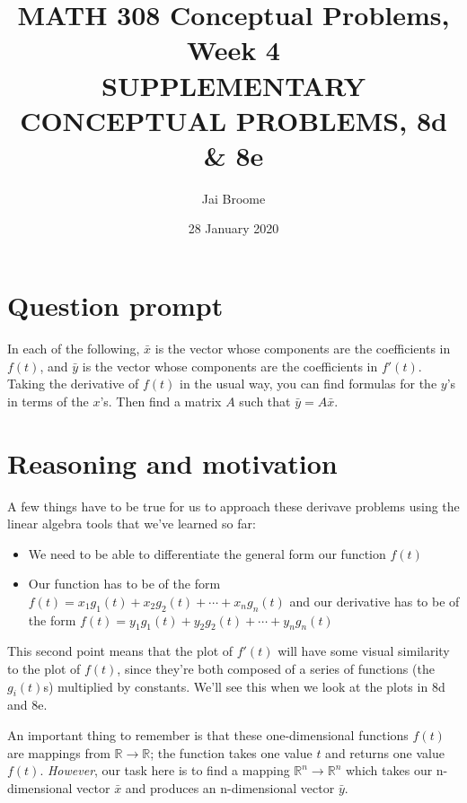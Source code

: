\documentclass[12pt]{article}
\title{MATH 308 Conceptual Problems, Week 4 \vspace{1em}\\\normalsize{SUPPLEMENTARY CONCEPTUAL PROBLEMS, 8d \& 8e}}
\author{Jai Broome}
\date{28 January 2020}
\begin{document}

\maketitle

\section{Question prompt}

In each of the following, $\bar{x}$ is the vector whose components are the coefficients
in $f(t)$, and $\bar{y}$ is the vector whose components are the coefficients in $f'(t)$. Taking
the derivative of $f(t)$ in the usual way, you can find formulas for the $y$'s in terms
of the $x$'s. Then find a matrix $A$ such that $\bar{y}=A\bar{x}$.

\section{Reasoning and motivation}

A few things have to be true for us to approach these derivave problems using the linear algebra
tools that we've learned so far:

\begin{itemize}
  \item We need to be able to differentiate the general form our function $f(t)$ 
  \item Our function has to be of the form $f(t)=x_1g_1(t)+x_2g_2(t)+\cdots +x_{n}g_n(t)$ and
    our derivative has to be of the form $f(t)=y_1g_1(t)+y_2g_2(t)+\cdots +y_{n}g_n(t)$
\end{itemize}

This second point means that the plot of $f'(t)$ will have some visual similarity to the plot of
$f(t)$, since they're both composed of a series of functions (the $g_i(t)$s) multiplied by constants.
We'll see this when we look at the plots in 8d and 8e.

An important thing to remember is that these one-dimensional functions $f(t)$ are mappings from
$\mathbb{R} \rightarrow \mathbb{R}$; the function takes one value $t$ and returns one value $f(t)$.
\textit{However}, our task here is to find a mapping $\mathbb{R}^n \rightarrow \mathbb{R}^n$ which
takes our n-dimensional vector $\bar{x}$ and produces an n-dimensional vector $\bar{y}$.
\end{document}
